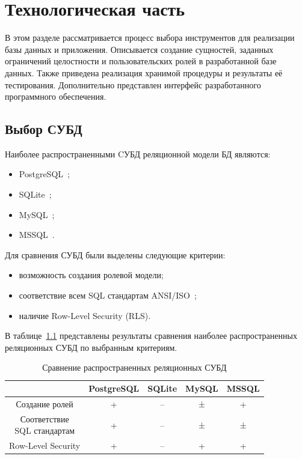 \chapter{Технологическая часть}

В этом разделе рассматривается процесс выбора инструментов для реализации базы данных и приложения. Описывается создание сущностей, заданных ограничений целостности и пользовательских ролей в разработанной базе данных. Также приведена реализация хранимой процедуры и результаты её тестирования. Дополнительно представлен интерфейс разработанного программного обеспечения.


\section{Выбор СУБД}

Наиболее распространенными CУБД реляционной модели БД являются:

\begin{itemize}[label=---]
    \item PostgreSQL~\cite{psql};
    \item SQLite~\cite{sqlite};
    \item MySQL~\cite{mysql};
    \item MSSQL~\cite{mssql}.
\end{itemize}

Для сравнения СУБД были выделены следующие критерии:
\begin{itemize}[label=---]
    \item возможность создания ролевой модели;
    \item соответствие всем SQL стандартам ANSI/ISO~\cite{ansi_iso};
    \item наличие Row-Level Security (RLS).
\end{itemize}

В таблице~\ref{table:rel_sql_comp} представлены результаты сравнения наиболее распространенных реляционных СУБД по выбранным критериям.

\begin{table}[H]
    \begin{center}
        \caption{Сравнение распространенных реляционных СУБД}
        \begin{tabular}{|c|c|c|c|c|}
            \hline
             & PostgreSQL & SQLite & MySQL & MSSQL \\
            \hline
            Создание ролей & + & -- & ± & + \\
            \hline
            \makecell{Соответствие\\ SQL стандартам} & + & -- & ± & ± \\
            \hline
            Row-Level Security & + & -- & + & + \\
            \hline
        \end{tabular}
        \label{table:rel_sql_comp}
    \end{center}
\end{table}

